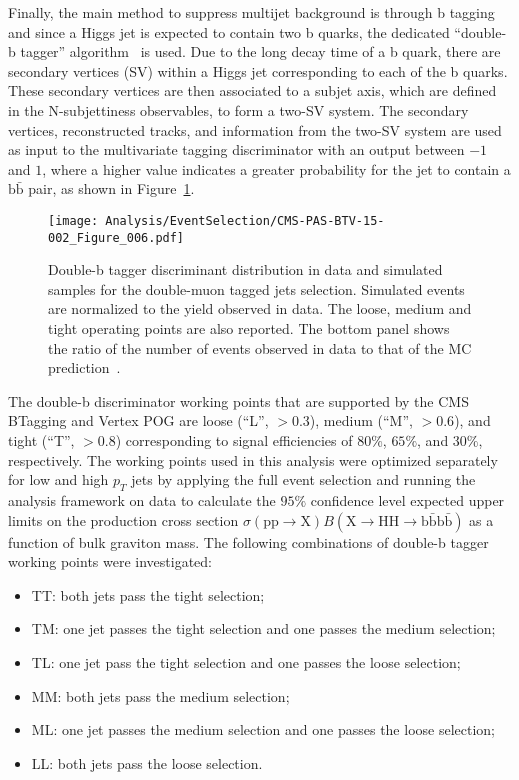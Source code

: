 Finally, the main method to suppress multijet background is through b tagging and since a Higgs jet is expected to contain two b quarks, the dedicated ``double-b tagger'' algorithm~\cite{DoubleB} is used. Due to the long decay time of a b quark, there are secondary vertices (SV) within a Higgs jet corresponding to each of the b quarks. These secondary vertices are then associated to a subjet axis, which are defined in the N-subjettiness observables, to form a two-SV system. The secondary vertices, reconstructed tracks, and information from the two-SV system are used as input to the multivariate tagging discriminator with an output between $-1$ and $1$, where a higher value indicates a greater probability for the jet to contain a $\mathrm{b\bar{b}}$ pair, as shown in Figure~\ref{fig:DoubleB}. 

\begin{figure}[h!]
\begin{center}
\texttt{[image: Analysis/EventSelection/CMS-PAS-BTV-15-002\_Figure\_006.pdf]}
\end{center}
\caption{Double-b tagger discriminant distribution in data and simulated samples for the double-muon tagged jets selection. Simulated events are normalized to the yield observed in data. The loose, medium and tight operating points are also reported. The bottom panel shows the ratio of the number of events observed in data to that of the MC prediction~\cite{DoubleB}.}
\label{fig:DoubleB}
\end{figure}

The double-b discriminator working points that are supported by the CMS BTagging and Vertex POG are loose (``L'', $>0.3$), medium (``M'', $>0.6$), and tight (``T'', $>0.8$) corresponding to signal efficiencies of $80\%$, $65\%$, and $30\%$, respectively. The working points used in this analysis were optimized separately for low and high $p_{T}$ jets by applying the full event selection and running the analysis framework on data to calculate the $95\%$ confidence level expected upper limits on the production cross section $\sigma(\mathrm{pp}\rightarrow \mathrm{X})B(\mathrm{X}\rightarrow\mathrm{HH}\rightarrow\mathrm{b\bar{b}b\bar{b}})$ as a function of bulk graviton mass. The following combinations of double-b tagger working points were investigated:

\begin{itemize}
\item TT: both jets pass the tight selection;
\item TM: one jet passes the tight selection and one passes the medium selection;
\item TL: one jet pass the tight selection and one passes the loose selection;
\item MM: both jets pass the medium selection;
\item ML: one jet passes the medium selection and one passes the loose selection;
\item LL: both jets pass the loose selection.
\end{itemize}


